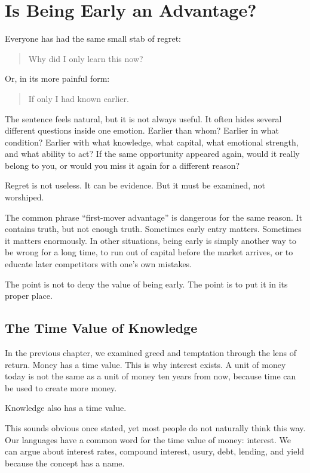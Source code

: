 \chapter{Is Being Early an Advantage?}

Everyone has had the same small stab of regret:

\begin{quote}
Why did I only learn this now?
\end{quote}

Or, in its more painful form:

\begin{quote}
If only I had known earlier.
\end{quote}

The sentence feels natural, but it is not always useful. It often hides several different questions inside one emotion. Earlier than whom? Earlier in what condition? Earlier with what knowledge, what capital, what emotional strength, and what ability to act? If the same opportunity appeared again, would it really belong to you, or would you miss it again for a different reason?

Regret is not useless. It can be evidence. But it must be examined, not worshiped.

The common phrase ``first-mover advantage'' is dangerous for the same reason. It contains truth, but not enough truth. Sometimes early entry matters. Sometimes it matters enormously. In other situations, being early is simply another way to be wrong for a long time, to run out of capital before the market arrives, or to educate later competitors with one's own mistakes.

The point is not to deny the value of being early. The point is to put it in its proper place.

\section*{The Time Value of Knowledge}

In the previous chapter, we examined greed and temptation through the lens of return. Money has a time value. This is why interest exists. A unit of money today is not the same as a unit of money ten years from now, because time can be used to create more money.

Knowledge also has a time value.

This sounds obvious once stated, yet most people do not naturally think this way. Our languages have a common word for the time value of money: interest. We can argue about interest rates, compound interest, usury, debt, lending, and yield because the concept has a name.

